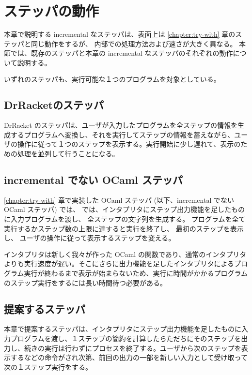 \section{ステッパの動作}

本章で説明する incremental なステッパは、表面上は \ref{chapter:try-with} 章のステッパと同じ動作をするが、
内部での処理方法および速さが大きく異なる。
本節では、既存のステッパと本章の incremental なステッパのそれぞれの動作について説明する。

いずれのステッパも、実行可能な１つのプログラムを対象としている。

\subsection{DrRacketのステッパ}
\label{ステッパの動作-DrRacketのステッパ}
DrRacket のステッパ\cite{clements01}は、ユーザが入力したプログラムを全ステップの情報を生成するプログラムへ変換し、それを実行してステップの情報を蓄えながら、ユーザの操作に従って１つのステップを表示する。実行開始に少し遅れて、表示のための処理を並列して行うことになる。

\subsection{incremental でない OCaml ステッパ}
\label{ステッパの動作-incrementalでないOCamlステッパ}

\ref{chapter:try-with} 章で実装した OCaml ステッパ (以下、incremental でない OCaml ステッパ) では、
では、インタプリタにステップ出力機能を足したものに入力プログラムを渡し、
全ステップの文字列を生成する。
プログラムを全て実行するかステップ数の上限に達すると実行を終了し、
最初のステップを表示し、
ユーザの操作に従って表示するステップを変える。

インタプリタは新しく我々が作った OCaml の関数であり、通常のインタプリタよりも実行速度が遅い。そこにさらに出力機能を足したインタプリタによるプログラム実行が終わるまで表示が始まらないため、実行に時間がかかるプログラムのステップ実行をするには長い時間待つ必要がある。

\subsection{提案するステッパ}
\label{ステッパの動作-提案するステッパ}

本章で提案するステッパは、インタプリタにステップ出力機能を足したものに入力プログラムを渡し、１ステップの簡約を計算したらただちにそのステップを出力し、続きの実行は行わずにプロセスを終了する。ユーザから次のステップを表示するなどの命令がされ次第、前回の出力の一部を新しい入力として受け取って次の１ステップ実行をする。

